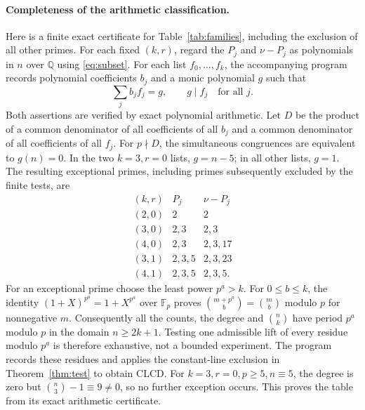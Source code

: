 \documentclass[11pt]{article}
\begin{document}
\paragraph{Completeness of the arithmetic classification.}
Here is a finite exact certificate for Table~\ref{tab:families}, including
the exclusion of all other primes. For each fixed $(k,r)$, regard the
$P_j$ and $\nu-P_j$ as polynomials in $n$ over $\mathbb Q$ using
\eqref{eq:subset}. For each list $f_0,\ldots,f_k$, the accompanying program
records polynomial coefficients $b_j$ and a monic polynomial $g$ such that
\[
 \sum_j b_jf_j=g,\qquad g\mid f_j\quad\text{for all }j.
\]
Both assertions are verified by exact polynomial arithmetic. Let $D$ be
the product of a common denominator of all coefficients of all $b_j$ and
a common denominator of all coefficients of all $f_j$.
For $p\nmid D$, the simultaneous congruences are equivalent to $g(n)=0$.
In the two $k=3,r=0$ lists, $g=n-5$; in all other lists, $g=1$.
The resulting exceptional primes, including primes subsequently excluded
by the finite tests, are
\[
\begin{array}{c|cc}
(k,r)&P_j&\nu-P_j\\\hline
(2,0)&2&2\\
(3,0)&2,3&2,3\\
(4,0)&2,3&2,3,17\\
(3,1)&2,3,5&2,3,23\\
(4,1)&2,3,5&2,3,5.
\end{array}
\]
For an exceptional prime choose the least power $p^a>k$. For $0\leq b\leq k$,
the identity $(1+X)^{p^a}=1+X^{p^a}$ over $\mathbb F_p$ proves
$\binom{m+p^a}{b}=\binom mb$ modulo $p$ for nonnegative $m$.
Consequently all the counts, the degree and $\binom nk$ have period $p^a$
modulo $p$ in the domain $n\geq2k+1$. Testing one admissible lift of every
residue modulo $p^a$ is therefore exhaustive, not a bounded experiment.
The program records these residues and applies the constant-line exclusion
in Theorem~\ref{thm:test} to obtain CLCD. For $k=3,r=0,p\geq5,n\equiv5$,
the degree is zero but $\binom n3-1\equiv9\ne0$, so no further exception
occurs. This proves the table from its exact arithmetic certificate.
\end{document}
